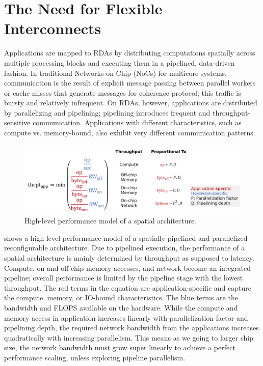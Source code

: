 \section{The Need for Flexible Interconnects}
Applications are mapped to RDAs by distributing computations spatially across multiple processing
blocks and executing them in a pipelined, data-driven fashion. 
In traditional Networks-on-Chip
(NoCs) for multicore systems, communication is the result of explicit message passing between
parallel workers or cache misses that generate messages for coherence protocol; this traffic is bursty and
relatively infrequent. 
On RDAs, however, applications are distributed by parallelizing and pipelining; 
pipelining introduces frequent and throughput-sensitive communication. 
Applications with different characteristics, such as compute vs. memory-bound, also exhibit 
very different communication patterns.

\begin{figure}
\centering
\includegraphics[width=1\textwidth]{figs/perfmodel.pdf}
\caption[High-level performance model of a spatial architecture]{
High-level performance model of a spatial architecture. 
}
\label{fig:perfmodel}
\end{figure}

 shows a high-level performance model of a spatially pipelined and parallelized
reconfigurable architecture.
Due to pipelined execution, the performance of a spatial architecture is mainly determined by throughput as
supposed to latency. 
Compute, on and off-chip memory accesses, and network become an integrated pipeline;
overall performance is limited by the pipeline stage with the lowest throughput.
The red terms in the equation are application-specific and capture the compute, memory, or IO-bound characteristics.
The blue terms are the bandwidth and FLOPS available on the hardware.
While the compute and memory access in application increases linearly with parallelization factor and pipelining depth,
the required network bandwidth from the applications increases quadratically with increasing parallelism.
This means as we going to larger chip size, the network bandwidth must grow super linearly to achieve a perfect performance scaling, unless exploring pipeline parallelism.


